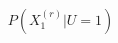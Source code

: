 \documentclass[preview]{standalone}
\begin{document}
\begin{align*}
P(X^{(r)}_1 | U=1)
\end{align*}
\end{document}
